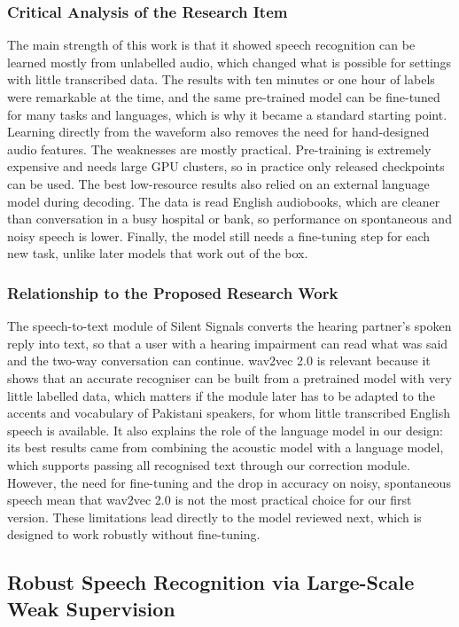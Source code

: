\documentclass{FastFyp}
\begin{document}
\subsubsection*{Critical Analysis of the Research Item}
The main strength of this work is that it showed speech recognition can be learned mostly from unlabelled audio, which changed what is possible for settings with little transcribed data. The results with ten minutes or one hour of labels were remarkable at the time, and the same pre-trained model can be fine-tuned for many tasks and languages, which is why it became a standard starting point. Learning directly from the waveform also removes the need for hand-designed audio features. The weaknesses are mostly practical. Pre-training is extremely expensive and needs large GPU clusters, so in practice only released checkpoints can be used. The best low-resource results also relied on an external language model during decoding. The data is read English audiobooks, which are cleaner than conversation in a busy hospital or bank, so performance on spontaneous and noisy speech is lower. Finally, the model still needs a fine-tuning step for each new task, unlike later models that work out of the box.

\subsubsection*{Relationship to the Proposed Research Work}
The speech-to-text module of Silent Signals converts the hearing partner's spoken reply into text, so that a user with a hearing impairment can read what was said and the two-way conversation can continue. wav2vec 2.0 is relevant because it shows that an accurate recogniser can be built from a pretrained model with very little labelled data, which matters if the module later has to be adapted to the accents and vocabulary of Pakistani speakers, for whom little transcribed English speech is available. It also explains the role of the language model in our design: its best results came from combining the acoustic model with a language model, which supports passing all recognised text through our correction module. However, the need for fine-tuning and the drop in accuracy on noisy, spontaneous speech mean that wav2vec 2.0 is not the most practical choice for our first version. These limitations lead directly to the model reviewed next, which is designed to work robustly without fine-tuning.

\subsection{Robust Speech Recognition via Large-Scale Weak Supervision}
\end{document}
